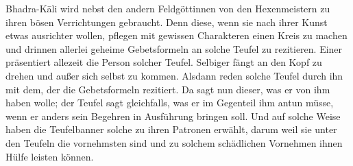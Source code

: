 \documentclass{article}
\begin{document}
Bhadra-K\={a}li wird nebst den andern Feldgöttinnen von den Hexenmeistern zu ihren bösen Verrichtungen gebraucht. Denn diese, wenn sie nach ihrer Kunst etwas ausrichter wollen, pflegen mit gewissen Charakteren einen Kreis zu machen und drinnen allerlei geheime Gebetsformeln an solche Teufel zu rezitieren. Einer präsentiert allezeit die Person solcher Teufel. Selbiger fängt an den Kopf zu drehen und außer sich selbst zu kommen. Alsdann reden solche Teufel durch ihn mit dem, der die Gebetsformeln rezitiert. Da sagt nun dieser, was er von ihm haben wolle; der Teufel sagt gleichfalls, was er im Gegenteil ihm antun müsse, wenn er anders sein Begehren in Ausführung bringen soll. Und auf solche Weise haben die Teufelbanner solche zu ihren Patronen erwählt, darum weil sie unter den Teufeln die vornehmsten sind und zu solchem schädlichen Vornehmen ihnen Hülfe leisten können.
\end{document}
